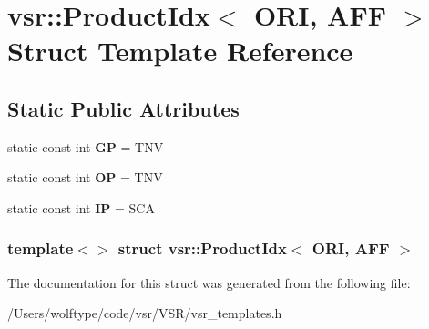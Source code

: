 \hypertarget{structvsr_1_1_product_idx_3_01_o_r_i_00_01_a_f_f_01_4}{\section{vsr\-:\-:Product\-Idx$<$ O\-R\-I, A\-F\-F $>$ Struct Template Reference}
\label{structvsr_1_1_product_idx_3_01_o_r_i_00_01_a_f_f_01_4}
}
\subsection*{Static Public Attributes}
\begin{DoxyCompactItemize}
\item 
\hypertarget{structvsr_1_1_product_idx_3_01_o_r_i_00_01_a_f_f_01_4_a48d1e2cde7cc3a0f0d5de332e9d517ec}{static const int {\bfseries G\-P} = T\-N\-V}\label{structvsr_1_1_product_idx_3_01_o_r_i_00_01_a_f_f_01_4_a48d1e2cde7cc3a0f0d5de332e9d517ec}

\item 
\hypertarget{structvsr_1_1_product_idx_3_01_o_r_i_00_01_a_f_f_01_4_a14a842727059ba369b7e9e03af4acac0}{static const int {\bfseries O\-P} = T\-N\-V}\label{structvsr_1_1_product_idx_3_01_o_r_i_00_01_a_f_f_01_4_a14a842727059ba369b7e9e03af4acac0}

\item 
\hypertarget{structvsr_1_1_product_idx_3_01_o_r_i_00_01_a_f_f_01_4_aefda1360505292afaf931758ed732731}{static const int {\bfseries I\-P} = S\-C\-A}\label{structvsr_1_1_product_idx_3_01_o_r_i_00_01_a_f_f_01_4_aefda1360505292afaf931758ed732731}

\end{DoxyCompactItemize}
\subsubsection*{template$<$$>$ struct vsr\-::\-Product\-Idx$<$ O\-R\-I, A\-F\-F $>$}



The documentation for this struct was generated from the following file\-:\begin{DoxyCompactItemize}
\item 
/\-Users/wolftype/code/vsr/\-V\-S\-R/vsr\-\_\-templates.\-h\end{DoxyCompactItemize}
